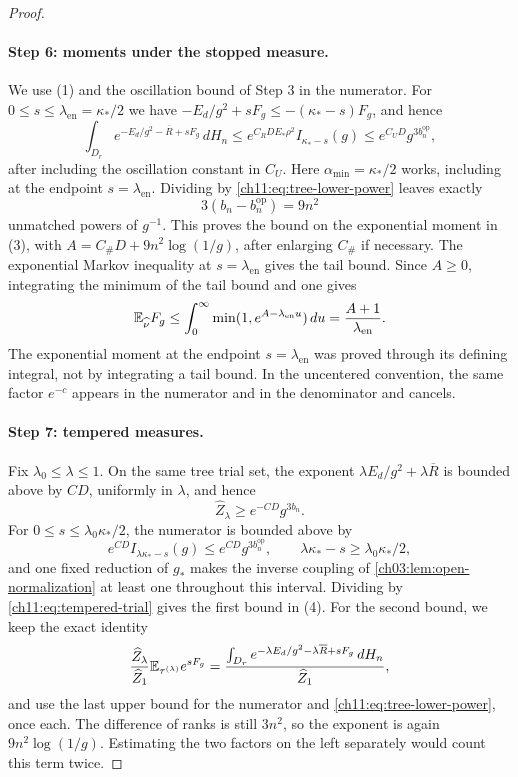 \begin{proof}
\paragraph{Step 6: moments under the stopped measure.}
We use (1) and the oscillation bound of Step 3 in the numerator. For $0\le s\le\lambda_{\mathrm{en}}=\kappa_*/2$ we have $-E_d/g^2+sF_g\le-(\kappa_*-s)F_g$, and hence
\[
 \int_{D_r}e^{-E_d/g^2-\overline R+sF_g}\,dH_n\le e^{C_RDE_*\rho^2}I_{\kappa_*-s}(g)\le e^{C_UD}g^{3b_n^{\mathrm{op}}},
\]
after including the oscillation constant in $C_U$. Here $\alpha_{\min}=\kappa_*/2$ works, including at the endpoint $s=\lambda_{\mathrm{en}}$. Dividing by \eqref{ch11:eq:tree-lower-power} leaves exactly
\[
 3(b_n-b_n^{\mathrm{op}})=9n^2
\]
unmatched powers of $g^{-1}$. This proves the bound on the exponential moment in (3), with $A=C_\#D+9n^2\log(1/g)$, after enlarging $C_\#$ if necessary. The exponential Markov inequality at $s=\lambda_{\mathrm{en}}$ gives the tail bound. Since $A\ge0$, integrating the minimum of the tail bound and one gives
\[
 \mathbb E_{\widehat\nu}F_g\le\int_0^\infty\min(1,e^{A-\lambda_{\mathrm{en}}u})\,du=\frac{A+1}{\lambda_{\mathrm{en}}}.
\]
The exponential moment at the endpoint $s=\lambda_{\mathrm{en}}$ was proved through its defining integral, not by integrating a tail bound. In the uncentered convention, the same factor $e^{-c}$ appears in the numerator and in the denominator and cancels.

\paragraph{Step 7: tempered measures.}
Fix $\lambda_0\le\lambda\le1$. On the same tree trial set, the exponent $\lambda E_d/g^2+\lambda\overline R$ is bounded above by $CD$, uniformly in $\lambda$, and hence
\begin{equation}\label{ch11:eq:tempered-trial}
 \widehat Z_\lambda\ge e^{-CD}g^{3b_n}.
\end{equation}
For $0\le s\le\lambda_0\kappa_*/2$, the numerator is bounded above by
\[
 e^{CD}I_{\lambda\kappa_*-s}(g)\le e^{CD}g^{3b_n^{\mathrm{op}}},\qquad\lambda\kappa_*-s\ge\lambda_0\kappa_*/2,
\]
and one fixed reduction of $g_*$ makes the inverse coupling of \cref{ch03:lem:open-normalization} at least one throughout this interval. Dividing by \eqref{ch11:eq:tempered-trial} gives the first bound in (4). For the second bound, we keep the exact identity
\[
 \frac{\widehat Z_\lambda}{\widehat Z_1}\mathbb E_{\tau^{(\lambda)}}e^{sF_g}
 =\frac{\int_{D_r}e^{-\lambda E_d/g^2-\lambda\overline R+sF_g}\,dH_n}{\widehat Z_1},
\]
and use the last upper bound for the numerator and \eqref{ch11:eq:tree-lower-power}, once each. The difference of ranks is still $3n^2$, so the exponent is again $9n^2\log(1/g)$. Estimating the two factors on the left separately would count this term twice.


\end{proof}
